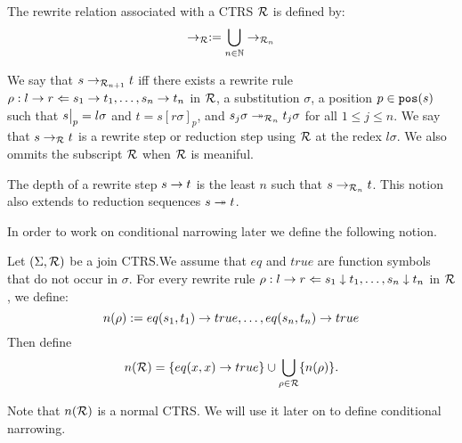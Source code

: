 The rewrite relation associated with a CTRS $\mathcal{R}$ is defined by:
\begin{displaymath}
    \rightarrow_{\mathcal{R}} :=  \bigcup\limits_{n \in \mathbb{N}} \rightarrow_{\mathcal{R}_n}
\end{displaymath}

We say that $s \rightarrow_{\mathcal{R}_{n+1}} t$ iff there exists a rewrite rule $\rho : l \rightarrow r \Leftarrow s_1 \rightarrow t_1, \dots, s_n \rightarrow t_n$ in $\mathcal{R}$, a substitution $\sigma$, a position $p \in \mathtt{pos}(s)$ such that $\restr{s}{p} = l \sigma$ and $t = s[r\sigma]_p$, and $s_j \sigma \twoheadrightarrow_{\mathcal{R}_n} t_j \sigma$ for all $1 \leq j \leq n$. We say that $s \rightarrow_{\mathcal{R}} t$ is a rewrite step or reduction step using $\mathcal{R}$ at the redex $l\sigma$. We also ommits the subscript $\mathcal{R}$ when $\mathcal{R}$ is meaniful.

The depth of a rewrite step $s \rightarrow t$ is the least $n$ such that $s \rightarrow_{\mathcal{R}_n} t$. This notion also extends to reduction sequences $s \twoheadrightarrow t$.

In order to work on conditional narrowing later we define the following notion.
\begin{definition}\label{definition:ctrs-approximation-rewrite-relation}
    Let $(\Sigma, \mathcal{R})$ be a join CTRS.We assume that $eq$ and $true$ are function symbols that do not occur in $\sigma$. For every rewrite rule $\rho: l \rightarrow r \Leftarrow s_1 \downarrow t_1, \dots, s_n \downarrow t_n$ in $\mathcal{R}$, we define:
    $$n(\rho) := eq(s_1, t_1) \rightarrow true, \dots, eq(s_n, t_n) \rightarrow true$$
    Then define $$n(\mathcal{R}) = \{ eq(x,x) \rightarrow true \} \cup \bigcup\limits_{\rho \in \mathcal{R}} \{ n(\rho) \}.$$
\end{definition}
Note that $n(\mathcal{R})$ is a normal CTRS. We will use it later on to define conditional narrowing.

